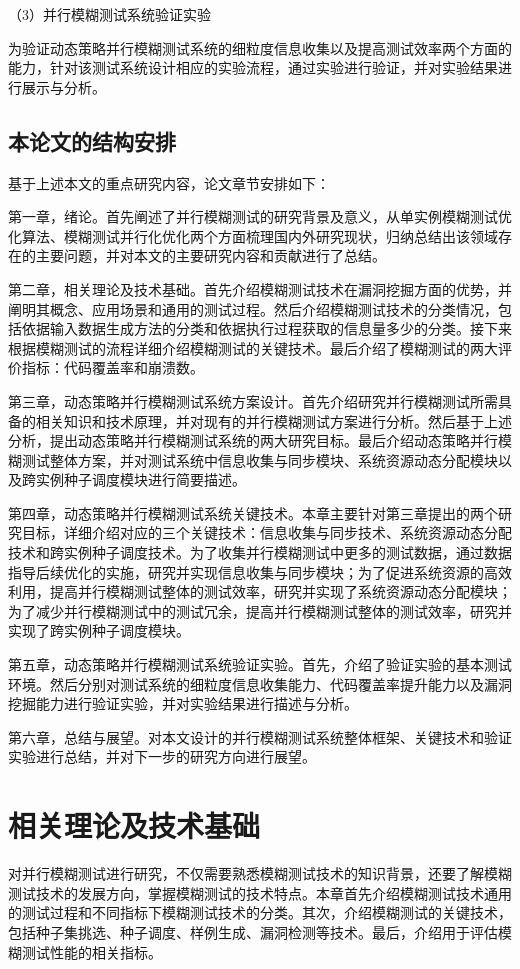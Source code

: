 \documentclass[master]{thesis-uestc}
\begin{document}
（3）并行模糊测试系统验证实验

为验证动态策略并行模糊测试系统的细粒度信息收集以及提高测试效率两个方面的能力，针对该测试系统设计相应的实验流程，通过实验进行验证，并对实验结果进行展示与分析。

\section{本论文的结构安排}
基于上述本文的重点研究内容，论文章节安排如下：

第一章，绪论。首先阐述了并行模糊测试的研究背景及意义，从单实例模糊测试优化算法、模糊测试并行化优化两个方面梳理国内外研究现状，归纳总结出该领域存在的主要问题，并对本文的主要研究内容和贡献进行了总结。

第二章，相关理论及技术基础。首先介绍模糊测试技术在漏洞挖掘方面的优势，并阐明其概念、应用场景和通用的测试过程。然后介绍模糊测试技术的分类情况，包括依据输入数据生成方法的分类和依据执行过程获取的信息量多少的分类。接下来根据模糊测试的流程详细介绍模糊测试的关键技术。最后介绍了模糊测试的两大评价指标：代码覆盖率和崩溃数。

第三章，动态策略并行模糊测试系统方案设计。首先介绍研究并行模糊测试所需具备的相关知识和技术原理，并对现有的并行模糊测试方案进行分析。然后基于上述分析，提出动态策略并行模糊测试系统的两大研究目标。最后介绍动态策略并行模糊测试整体方案，并对测试系统中信息收集与同步模块、系统资源动态分配模块以及跨实例种子调度模块进行简要描述。

第四章，动态策略并行模糊测试系统关键技术。本章主要针对第三章提出的两个研究目标，详细介绍对应的三个关键技术：信息收集与同步技术、系统资源动态分配技术和跨实例种子调度技术。为了收集并行模糊测试中更多的测试数据，通过数据指导后续优化的实施，研究并实现信息收集与同步模块；为了促进系统资源的高效利用，提高并行模糊测试整体的测试效率，研究并实现了系统资源动态分配模块；为了减少并行模糊测试中的测试冗余，提高并行模糊测试整体的测试效率，研究并实现了跨实例种子调度模块。

第五章，动态策略并行模糊测试系统验证实验。首先，介绍了验证实验的基本测试环境。然后分别对测试系统的细粒度信息收集能力、代码覆盖率提升能力以及漏洞挖掘能力进行验证实验，并对实验结果进行描述与分析。

第六章，总结与展望。对本文设计的并行模糊测试系统整体框架、关键技术和验证实验进行总结，并对下一步的研究方向进行展望。

\chapter{相关理论及技术基础}
对并行模糊测试进行研究，不仅需要熟悉模糊测试技术的知识背景，还要了解模糊测试技术的发展方向，掌握模糊测试的技术特点。本章首先介绍模糊测试技术通用的测试过程和不同指标下模糊测试技术的分类。其次，介绍模糊测试的关键技术，包括种子集挑选、种子调度、样例生成、漏洞检测等技术。最后，介绍用于评估模糊测试性能的相关指标。
\end{document}
